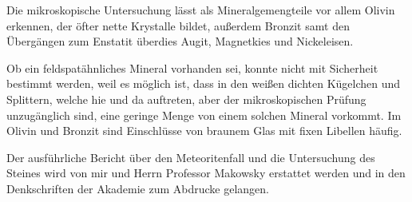 \documentclass[a4paper, 11pt, oneside]{article}
\begin{document}
Die mikroskopische Untersuchung lässt als Mineralgemengteile vor allem Olivin erkennen, der öfter nette Krystalle bildet, außerdem Bronzit samt den Übergängen zum Enstatit überdies Augit, Magnetkies und Nickeleisen.

Ob ein feldspatähnliches Mineral vorhanden sei, konnte nicht mit Sicherheit bestimmt werden, weil es möglich ist, dass in den weißen dichten Kügelchen und Splittern, welche hie und da auftreten, aber der mikroskopischen Prüfung unzugänglich sind, eine geringe Menge von einem solchen Mineral vorkommt. Im Olivin und Bronzit sind Einschlüsse von braunem Glas mit fixen Libellen häufig.

Der ausführliche Bericht über den Meteoritenfall und die Untersuchung des Steines wird von mir und Herrn Professor Makowsky erstattet werden und in den Denkschriften der Akademie zum Abdrucke gelangen.
\clearpage
\end{document}
